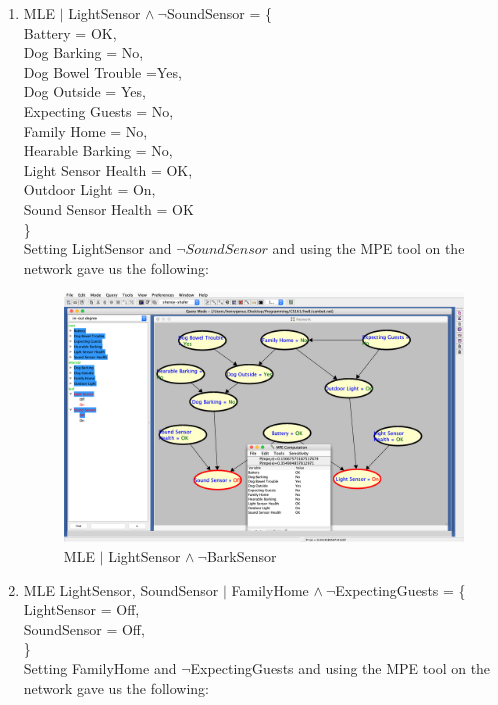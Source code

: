 \documentclass{article}
\begin{document}
\begin{enumerate}
\begin{enumerate}
			\item MLE $|$ LightSensor $\land \ \neg$SoundSensor = \{\\
				\indent Battery = OK, \\
				\indent Dog Barking = No, \\
				\indent Dog Bowel Trouble =Yes, \\
				\indent Dog Outside = Yes, \\
				\indent Expecting Guests = No, \\
				\indent Family Home = No, \\
				\indent Hearable Barking = No, \\
				\indent Light Sensor Health = OK, \\
				\indent Outdoor Light = On, \\
				\indent Sound Sensor Health = OK \\
				\} \\
				Setting LightSensor and $\neg SoundSensor$ and using the MPE
					tool on the network gave us the following:
				\begin{figure}[H]
					\centering
					\includegraphics[width = \textwidth]{MPE_LS~BS.png}%
					\caption{MLE $|$ LightSensor $\land \ \neg$BarkSensor }
					\label{fig:L~B}
				\end{figure}
			\clearpage
			\item MLE LightSensor, SoundSensor 
					$|$ FamilyHome $\land \ \neg$ExpectingGuests = \{\\
				\indent LightSensor = Off, \\
				\indent SoundSensor = Off, \\
				\} \\
				Setting FamilyHome and $\neg$ExpectingGuests and using the MPE
					tool on the network gave us the following:

\end{enumerate}
\end{enumerate}
\end{document}
